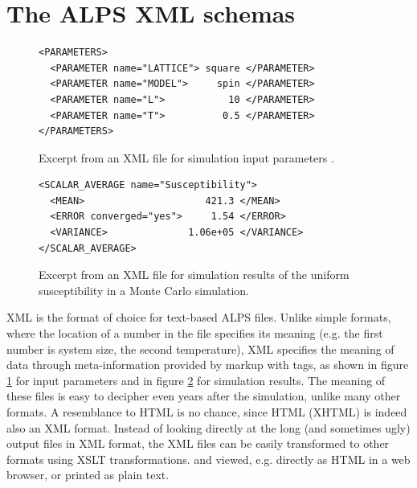 \documentclass[12pt]{iopart}
\begin{document}
\section{The ALPS XML schemas}
\label{sec:xml}

\begin{figure}[tb]
\begin{lstlisting}
<PARAMETERS>
  <PARAMETER name="LATTICE"> square </PARAMETER>
  <PARAMETER name="MODEL">     spin </PARAMETER>
  <PARAMETER name="L">           10 </PARAMETER>
  <PARAMETER name="T">          0.5 </PARAMETER>
</PARAMETERS>
\end{lstlisting}
\caption{Excerpt from an XML file for simulation input parameters .}
\label{fig:parm}
\end{figure}
\begin{figure}[tb]
\begin{lstlisting}
<SCALAR_AVERAGE name="Susceptibility">
  <MEAN>                     421.3 </MEAN>
  <ERROR converged="yes">     1.54 </ERROR>
  <VARIANCE>              1.06e+05 </VARIANCE>
</SCALAR_AVERAGE>
\end{lstlisting}
\caption{Excerpt from an XML file for simulation results of the uniform susceptibility in a Monte Carlo simulation.}
\label{fig:result}
\end{figure}


XML is the format of choice for text-based ALPS files. Unlike simple formats, where the location of a number in the file specifies its meaning (e.g. the first number is system size, the second temperature), XML specifies the meaning of data through meta-information provided by markup with tags, as shown in figure \ref{fig:parm} for input parameters and in  figure \ref{fig:result} for simulation results. The meaning of these files is easy to decipher even years after the simulation, unlike many other formats. A resemblance to HTML is no chance, since HTML (XHTML) is indeed also an XML format. Instead of looking directly at the long (and sometimes ugly) output files in XML format, the XML files can be easily transformed to other formats using XSLT transformations.\cite{xslt} and viewed, e.g. directly as HTML in a web browser, or printed as plain text. 
\end{document}
